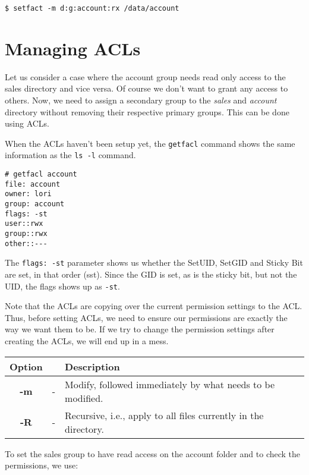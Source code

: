 \vspace{-15pt}
\begin{verbatim}
$ setfact -m d:g:account:rx /data/account
\end{verbatim}
\vspace{-10pt}

\section{Managing ACLs}
Let us consider a case where the account group needs read only access to the sales directory and vice versa. Of course we don't want to grant any access to others. Now, we need to assign a secondary group to the \textit{sales} and \textit{account} directory without removing their respective primary groups. This can be done using ACLs. 

When the ACLs haven't been setup yet, the \verb|getfacl| command shows the same information as the \verb|ls -l| command. 
\vspace{-15pt}
\begin{verbatim}
# getfacl account
file: account
owner: lori
group: account
flags: -st
user::rwx
group::rwx
other::---
\end{verbatim}
\vspace{-10pt}

\noindent
The \verb|flags: -st| parameter shows us whether the SetUID, SetGID and Sticky Bit are set, in that order (sst). Since the GID is set, as is the sticky bit, but not the UID, the flags shows up as \verb|-st|. 

Note that the ACLs are copying over the current permission settings to the ACL. Thus, before setting ACLs, we need to ensure our permissions are exactly the way we want them to be. If we try to change the permission settings after creating the ACLs, we will end up in a mess. 

\begin{tabular}{ccl}
	\toprule
	\textbf{Option} & &\textbf{Description} \\
	\midrule
	\textbf{-m} &- &Modify, followed immediately by what needs to be modified. \\ 
	\textbf{-R} &- &Recursive, i.e., apply to all files currently in the directory. \\
	\bottomrule
\end{tabular}

\noindent
To set the sales group to have read access on the account folder and to check the permissions, we use:

